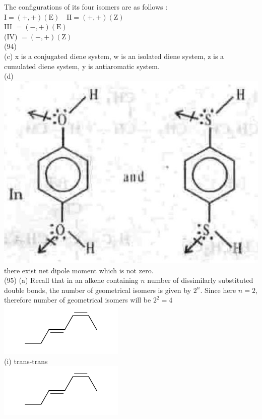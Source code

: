 \documentclass[10pt]{article}
\begin{document}
The configurations of its four isomers are as follows :\\
$\mathrm{I}=(+,+)(\mathrm{E}) \quad \mathrm{II}=(+,+)(\mathrm{Z})$\\
III $=(-,+)(\mathrm{E})$\\
(IV) $=(-,+)(\mathrm{Z})$\\
(94)\\
(c) x is a conjugated diene system, w is an isolated diene system, z is a cumulated diene system, y is antiaromatic system.\\
(d)\\
\includegraphics[max width=\textwidth, center]{2025_01_28_8470952b98110cec3aabg-160(2)}\\
there exist net dipole moment which is not zero.\\
(95) (a) Recall that in an alkene containing $n$ number of dissimilarly substituted double bonds, the number of geometrical isomers is given by $2^{n}$. Since here $n=2$, therefore number of geometrical isomers will be $2^{2}=4$\\
\includegraphics{smile-e7f0759f39ba467cf7577a2d13ada32624ffe34c}\\
(i) trans-trans\\
\includegraphics{smile-0233689acb6c7eccbe62a48dfa65d5bbea47693b}\\
\end{document}

